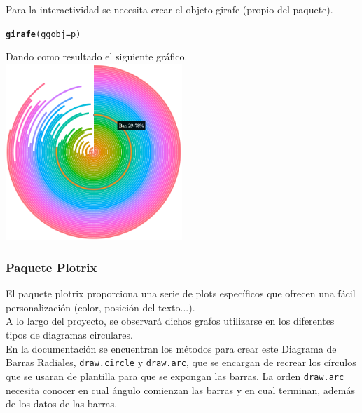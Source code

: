 \documentclass{article}\usepackage[]{graphicx}\usepackage[]{color}
\makeatletter
\newcommand{\hlstd}[1]{\textcolor[rgb]{0.345,0.345,0.345}{#1}}%
\newcommand{\hlkwc}[1]{\textcolor[rgb]{0.333,0.667,0.333}{#1}}%
\newcommand{\hlkwd}[1]{\textcolor[rgb]{0.737,0.353,0.396}{\textbf{#1}}}%
\newenvironment{kframe}{%
 \def\at@end@of@kframe{}%
 \ifinner\ifhmode%
  \def\at@end@of@kframe{\end{minipage}}%
  \begin{minipage}{\columnwidth}%
 \fi\fi%
 \def\FrameCommand##1{\hskip\@totalleftmargin \hskip-\fboxsep
 \colorbox{shadecolor}{##1}\hskip-\fboxsep
     \hskip-\linewidth \hskip-\@totalleftmargin \hskip\columnwidth}%
 \MakeFramed {\advance\hsize-\width
   \@totalleftmargin\z@ \linewidth\hsize
   \@setminipage}}%
 {\par\unskip\endMakeFramed%
 \at@end@of@kframe}
\newenvironment{knitrout}{}{} %
\makeatother
\begin{document}
Para la interactividad se necesita crear el objeto girafe (propio del paquete).
\begin{knitrout}
\color{fgcolor}\begin{kframe}
\begin{alltt}
\hlkwd{girafe}\hlstd{(}\hlkwc{ggobj} \hlstd{= p)}
\end{alltt}
\end{kframe}
\end{knitrout}
Dando como resultado el siguiente gr\'afico.~\\
\vbox{
    \centering
    \includegraphics[width=0.5\textwidth]{imag/bar_interactive}
}
\clearpage
\subsubsection{Paquete Plotrix}
El paquete plotrix proporciona una serie de plots espec\'ificos que ofrecen una f\'acil personalizaci\'on (color, posici\'on del texto...).~\\
A lo largo del proyecto, se observar\'a dichos grafos utilizarse en los diferentes tipos de diagramas circulares.~\\
En la documentaci\'on \cite{docu_plotrix}
se encuentran los m\'etodos para crear este Diagrama de Barras Radiales, \texttt{draw.circle} y \texttt{draw.arc}, que se encargan de recrear los c\'irculos que se usaran de plantilla para que se expongan las barras. La orden \texttt{draw.arc} necesita conocer en cual \'angulo comienzan las barras y en cual terminan, adem\'as de los datos de las barras.
\end{document}
